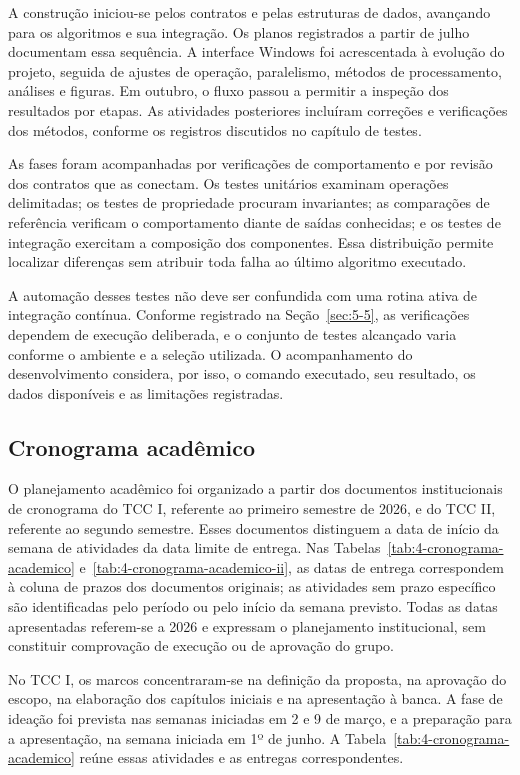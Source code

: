 A construção iniciou-se pelos contratos e pelas estruturas de dados, avançando para os algoritmos e sua integração. Os planos registrados a partir de julho documentam essa sequência. A interface Windows foi acrescentada à evolução do projeto, seguida de ajustes de operação, paralelismo, métodos de processamento, análises e figuras. Em outubro, o fluxo passou a permitir a inspeção dos resultados por etapas. As atividades posteriores incluíram correções e verificações dos métodos, conforme os registros discutidos no capítulo de testes.

As fases foram acompanhadas por verificações de comportamento e por revisão dos contratos que as conectam. Os testes unitários examinam operações delimitadas; os testes de propriedade procuram invariantes; as comparações de referência verificam o comportamento diante de saídas conhecidas; e os testes de integração exercitam a composição dos componentes. Essa distribuição permite localizar diferenças sem atribuir toda falha ao último algoritmo executado.

A automação desses testes não deve ser confundida com uma rotina ativa de integração contínua. Conforme registrado na Seção~\ref{sec:5-5}, as verificações dependem de execução deliberada, e o conjunto de testes alcançado varia conforme o ambiente e a seleção utilizada. O acompanhamento do desenvolvimento considera, por isso, o comando executado, seu resultado, os dados disponíveis e as limitações registradas.

\subsection{Cronograma acadêmico}

O planejamento acadêmico foi organizado a partir dos documentos institucionais de cronograma do TCC I, referente ao primeiro semestre de 2026, e do TCC II, referente ao segundo semestre. Esses documentos distinguem a data de início da semana de atividades da data limite de entrega. Nas Tabelas~\ref{tab:4-cronograma-academico} e~\ref{tab:4-cronograma-academico-ii}, as datas de entrega correspondem à coluna de prazos dos documentos originais; as atividades sem prazo específico são identificadas pelo período ou pelo início da semana previsto. Todas as datas apresentadas referem-se a 2026 e expressam o planejamento institucional, sem constituir comprovação de execução ou de aprovação do grupo.

No TCC I, os marcos concentraram-se na definição da proposta, na aprovação do escopo, na elaboração dos capítulos iniciais e na apresentação à banca. A fase de ideação foi prevista nas semanas iniciadas em 2 e 9 de março, e a preparação para a apresentação, na semana iniciada em 1º de junho. A Tabela~\ref{tab:4-cronograma-academico} reúne essas atividades e as entregas correspondentes.

